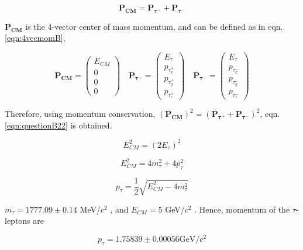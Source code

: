 \begin{equation}
	\label{eqn:4momConsB}
	\mathbf{P_{CM}} = \mathbf{P_{\tau^+}} + \mathbf{P_{\tau^-}}
\end{equation}

$\mathbf{P_{CM}}$ is the 4-vector center of mass momentum, and can be defined as in eqn. \ref{eqn:4vecmomB},

\begin{equation}
	\label{eqn:4vecmomB}
	\mathbf{P_{CM}} = \begin{pmatrix} E_{CM} \\ 0 \\ 0 \\ 0  \end{pmatrix} \quad
	\mathbf{P_{\tau^+}} = \begin{pmatrix} E_{\tau} \\ p_{\tau^+_x}\\p_{\tau^+_y}\\p_{\tau^+_z} \end{pmatrix} \quad
	\mathbf{P_{\tau^-}} = \begin{pmatrix} E_{\tau} \\ p_{\tau^-_x}\\p_{\tau^-_y}\\p_{\tau^-_z}  \end{pmatrix}
\end{equation}

Therefore, using momentum conservation, $\left(\mathbf{P_{CM}}\right)^2 = \left(\mathbf{P_{\tau^+}} + \mathbf{P_{\tau^-}}\right)^2$, eqn. \ref{eqn:questionB22} is obtained.

\begin{equation}
	\label{eqn:PcmB}
	E_{CM}^2 = \left( 2E_{\tau} \right) ^2
\end{equation}

\begin{equation}
	\label{eqn:questionB21}
	E_{CM}^2 = 4m_{\tau}^2 + 4p_{\tau}^2
\end{equation}

\begin{equation}
	\label{eqn:questionB22}
	p_{\tau} = \frac{1}{2}\sqrt{E_{CM}^2-4m_{\tau}^2}
\end{equation}

$m_{\tau}=1777.09\pm0.14$ MeV/$c^2$ \cite{belle2_taumass2023}, and $E_{CM} = 5$ GeV/$c^2$ \cite{atlaslabmanual}. Hence, momentum of the $\tau$-leptons are

\begin{equation}
	\label{eqn:taumomB}
	p_{\tau} = 1.75839 \pm 0.00056 \text{GeV/$c^2$}
\end{equation}

